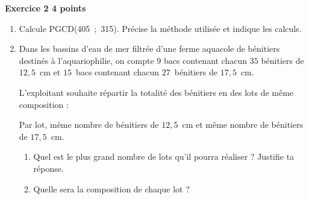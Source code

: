 \textbf{Exercice 2 \hfill 4 points}

\medskip

\begin{enumerate}
\item Calcule PGCD(405~;~315). Précise la méthode utilisée et indique les calculs. 
\item Dans les bassins d'eau de mer filtrée d'une ferme aquacole de bénitiers destinés à l'aquariophilie, on compte $9$ bacs contenant chacun $35$ bénitiers de $12,5$~cm et $15$~bacs contenant chacun $27$~bénitiers de $17,5$~cm.
 
L'exploitant souhaite répartir la totalité des bénitiers en des lots de même composition :
 
Par lot, même nombre de bénitiers de $12,5$~cm et même nombre de bénitiers de $17,5$~cm. 
	\begin{enumerate}
		\item Quel est le plus grand nombre de lots qu'il pourra réaliser ? Justifie ta réponse. 
		\item Quelle sera la composition de chaque lot ? 
	\end{enumerate}
\end{enumerate}

\bigskip


